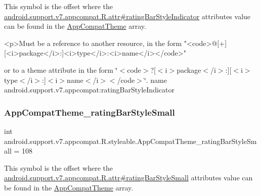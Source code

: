 This symbol is the offset where the \hyperlink{classandroid_1_1support_1_1v7_1_1appcompat_1_1R_1_1attr_a3ca56be9fcffd4b6eca62a54767c55bf}{android.\+support.\+v7.\+appcompat.\+R.\+attr\#rating\+Bar\+Style\+Indicator} attribute\textquotesingle{}s value can be found in the \hyperlink{classandroid_1_1support_1_1v7_1_1appcompat_1_1R_1_1styleable_a5c42f89e8a410c323be34208d75c430b}{App\+Compat\+Theme} array.

\begin{DoxyVerb}      <p>Must be a reference to another resource, in the form "<code>@[+][<i>package</i>:]<i>type</i>:<i>name</i></code>"
\end{DoxyVerb}
 or to a theme attribute in the form \char`\"{}$<$code$>$?\mbox{[}$<$i$>$package$<$/i$>$\+:\mbox{]}\mbox{[}$<$i$>$type$<$/i$>$\+:\mbox{]}$<$i$>$name$<$/i$>$$<$/code$>$\char`\"{}.  name android.\+support.\+v7.\+appcompat\+:rating\+Bar\+Style\+Indicator \mbox{\label{classandroid_1_1support_1_1v7_1_1appcompat_1_1R_1_1styleable_a3d5d0c2c3772e2f0c3548e65cffca34f}} 
\subsubsection{\texorpdfstring{App\+Compat\+Theme\+\_\+rating\+Bar\+Style\+Small}{AppCompatTheme\_ratingBarStyleSmall}}
{\footnotesize\ttfamily int android.\+support.\+v7.\+appcompat.\+R.\+styleable.\+App\+Compat\+Theme\+\_\+rating\+Bar\+Style\+Small = 108\hspace{0.3cm}{\ttfamily [static]}}

This symbol is the offset where the \hyperlink{classandroid_1_1support_1_1v7_1_1appcompat_1_1R_1_1attr_a449778fbfb018f0be16f0bb702ae6c0e}{android.\+support.\+v7.\+appcompat.\+R.\+attr\#rating\+Bar\+Style\+Small} attribute\textquotesingle{}s value can be found in the \hyperlink{classandroid_1_1support_1_1v7_1_1appcompat_1_1R_1_1styleable_a5c42f89e8a410c323be34208d75c430b}{App\+Compat\+Theme} array.

